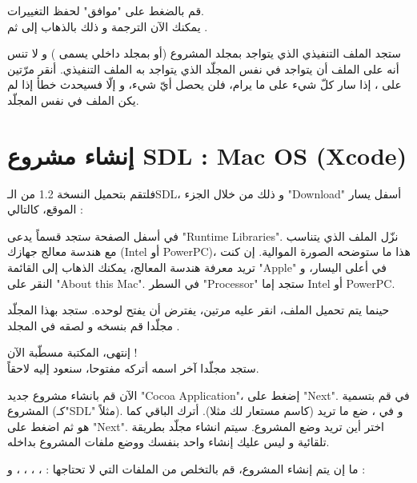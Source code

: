 قم بالضغط على "موافق" لحفظ التغييرات.\\
يمكنك الآن الترجمة و ذلك بالذهاب إلى
ثم
.

ستجد الملف التنفيذي الذي يتواجد بمجلد المشروع (أو بمجلد داخلي يسمى
)
و لا تنس أنه على الملف
أن يتواجد في نفس المجلّد الذي يتواجد به الملف التنفيذي. أنقر مرّتين على
،
 إذا سار كلّ شيء على ما يرام، فلن يحصل أيّ شيء، و إلّا فسيحدث خطأ إذا لم يكن الملف
في نفس المجلّد.

\section{إنشاء مشروع \textenglish{SDL} : \textenglish{Mac OS} (\textenglish{Xcode})}

فلتقم بتحميل النسخة 1.2 من الـ\textenglish{SDL}،
و ذلك من خلال الجزء
"\textenglish{Download}"
أسفل يسار الموقع، كالتالي :

في أسفل الصفحة ستجد قسماً يدعى 
"\textenglish{Runtime Libraries}".
نزّل الملف الذي يتناسب مع هندسة معالج جهازك
(\textenglish{Intel} أو \textenglish{PowerPC})،
 هذا ما ستوضحه الصورة الموالية. إن كنت تريد معرفة هندسة المعالج، يمكنك الذهاب إلى القائمة 
"\textenglish{Apple}"
في أعلى اليسار، و النقر على 
"\textenglish{About this Mac}".
في السطر 
"\textenglish{Processor}"
ستجد إما
\textenglish{Intel} أو \textenglish{PowerPC}.


حينما يتم تحميل الملف، انقر عليه مرتين، يفترض أن يفتح لوحده. ستجد بهذا المجلّد مجلّدا
قم بنسخه و لصقه في المجلد 
.

إنتهى، المكتبة مسطّبة الآن !\\
ستجد مجلّدا آخر اسمه 
أتركه مفتوحا، سنعود إليه لاحقاً.

الآن قم بانشاء مشروع جديد
"\textenglish{Cocoa Application}"،
إضغط على 
"\textenglish{Next}".
في 
قم بتسمية المشروع (كـ"\textenglish{SDL}"
مثلاً). و في 
،
ضع ما تريد (كاسم مستعار لك مثلا). أترك الباقي كما هو ثم اضغط على 
"\textenglish{Next}".
اختر أين تريد وضع المشروع. سيتم انشاء مجلّد بطريقة تلقائية و ليس عليك إنشاء واحد بنفسك ووضع ملفات المشروع بداخله.

ما إن يتم إنشاء المشروع، قم بالتخلص من الملفات التي لا تحتاجها :
، ، ، ،  و  :

